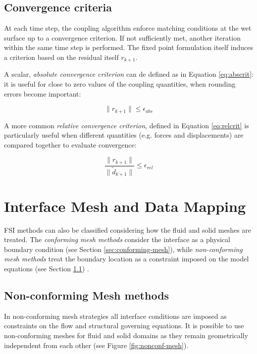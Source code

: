 \subsection{Convergence criteria}

At each time step, the coupling algorithm enforce matching conditions at the wet surface up to a convergence criterion. If not sufficiently met, another iteration within the same time step is performed. The fixed point formulation itself induces a criterion based on the residual itself $r_{k+1}$.

A scalar, \textit{absolute convergence criterion} can de defined as in Equation \ref{eq:abscrit}: it is useful for close to zero values of the coupling quantities, when rounding errors become important:

\begin{equation}
	\lVert r_{k+1} \rVert \leq \epsilon_{abs}
	\label{eq:abscrit}
\end{equation}

A more common \textit{relative convergence criterion}, defined in Equation \ref{eq:relcrit} is particularly useful when different quantities (e.g. forces and displacements) are compared together to evaluate convergence:


\begin{equation}
	\frac{\lVert  r_{k+1} \rVert}{\lVert  \tilde{d}_{k+1} \rVert} \leq \epsilon_{rel}
	\label{eq:relcrit}
\end{equation}



\section{Interface Mesh and Data Mapping}
\label{sec:interface-mesh}

FSI methods can also be classified considering how the fluid and solid meshes are treated. The \textit{conforming mesh methods} consider the interface as a physical boundary condition (see Section \ref{sec:conforming-mesh}), while \textit{non-conforming mesh methods} treat the boundary location as a constraint imposed on the model equations (see Section \ref{sec:nonconforming-mesh}) \cite{hou2012numerical}.


\subsection{Non-conforming Mesh methods}
\label{sec:nonconforming-mesh}

In non-conforming mesh strategies all interface conditions are imposed as constraints on the flow and structural governing equations. It is possible to use non-conforming meshes for fluid and solid domains as they remain geometrically independent from each other (see Figure \ref{fig:nonconf-mesh}).

